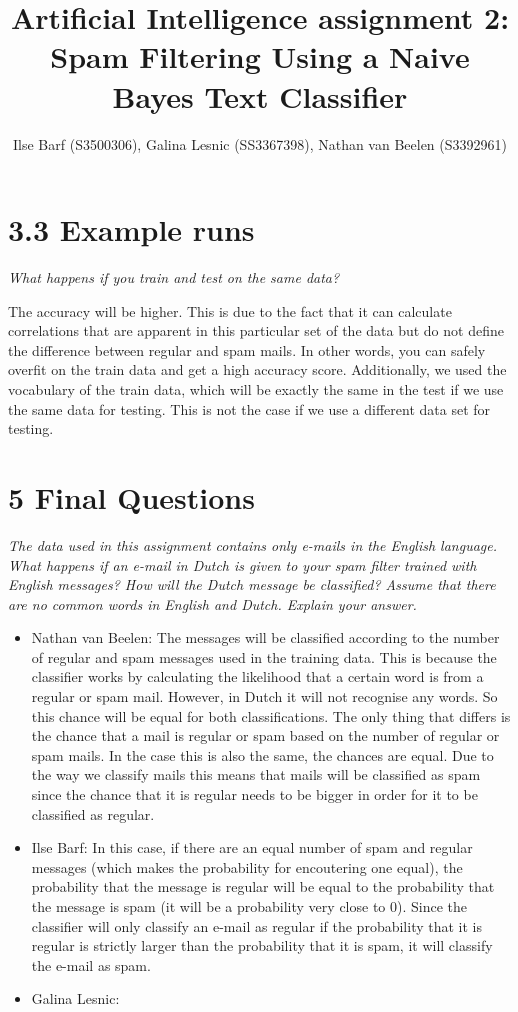 \documentclass{article}
\title{Artificial Intelligence assignment 2: Spam Filtering Using a Naive Bayes Text Classifier}
\author{Ilse Barf (S3500306), Galina Lesnic (SS3367398), Nathan van Beelen (S3392961)}
\begin{document}
\maketitle

\section*{3.3 Example runs}
\textit{What happens if you train and test on the same data?}

The accuracy will be higher. This is due to the fact that it can calculate
correlations that are apparent in this particular set of the data but do not
define the difference between regular and spam mails. In other words, you can
safely overfit on the train data and get a high accuracy score. Additionally,
we used the vocabulary of the train data, which will be exactly the same in the
test if we use the same data for testing. This is not the case if we use a
different data set for testing.

\section*{5 Final Questions}
\textit{The  data  used  in  this  assignment  contains  only  e-mails  in  the  English  language.
What happens if an e-mail in Dutch is given to your spam filter trained with English messages?
How  will  the  Dutch  message  be  classified?   Assume  that  there  are  no  common  words  in
English and Dutch.  Explain your answer.}
\begin{itemize}
    \item Nathan van Beelen: The messages will be classified according to the number of
          regular and spam messages used in the training data.
          This is because the classifier works by calculating the likelihood that a
          certain word is from a regular or spam mail. However, in Dutch it will not
          recognise any words. So this chance will be equal for both classifications.
          The only thing that differs is the chance that a mail is regular or spam based
          on the number of regular or spam mails. In the case this is also the same,
          the chances are equal. Due to the way we classify mails this means that
          mails will be classified as spam since the chance that it is regular needs
          to be bigger in order for it to be classified as regular.
    \item Ilse Barf: In this case, if there are an equal number of spam and regular messages
          (which makes the probability for encoutering one equal), the probability that the
          message is regular will be equal to the probability that the message is spam (it will be
          a probability very close to 0).
          Since the classifier will only classify an e-mail as regular if the probability that it
          is regular is strictly larger than the probability that it is spam, it will classify the
          e-mail as spam.
    \item Galina Lesnic:
\end{itemize}
\end{document}
